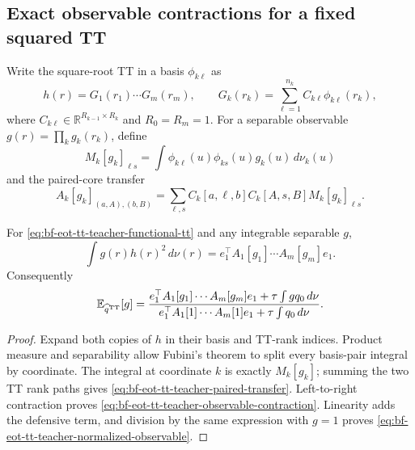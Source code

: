 \subsection{Exact observable contractions for a fixed squared TT}

Write the square-root TT in a basis \(\phi_{k\ell}\) as
\begin{equation}
 h(r)=G_1(r_1)\cdots G_m(r_m),\qquad
 G_k(r_k)=\sum_{\ell=1}^{n_k}C_{k\ell}\phi_{k\ell}(r_k),
 \label{eq:bf-eot-tt-teacher-functional-tt}
\end{equation}
where \(C_{k\ell}\in\mathbb R^{R_{k-1}\times R_k}\) and
\(R_0=R_m=1\).  For a separable observable
\(g(r)=\prod_kg_k(r_k)\), define
\begin{equation}
 M_k[g_k]_{\ell s}
 =\int\phi_{k\ell}(u)\phi_{ks}(u)g_k(u)\,d\nu_k(u)
 \label{eq:bf-eot-tt-teacher-operator-matrix}
\end{equation}
and the paired-core transfer
\begin{equation}
 A_k[g_k]_{(a,A),(b,B)}
 =\sum_{\ell,s}C_k[a,\ell,b]C_k[A,s,B]M_k[g_k]_{\ell s}.
 \label{eq:bf-eot-tt-teacher-paired-transfer}
\end{equation}

\begin{proposition}
\label{prop:bf-eot-tt-teacher-observable-contraction}
For \eqref{eq:bf-eot-tt-teacher-functional-tt} and any integrable separable
\(g\),
\begin{equation}
 \int g(r)h(r)^2\,d\nu(r)
 =e_1^\top A_1[g_1]\cdots A_m[g_m]e_1.
 \label{eq:bf-eot-tt-teacher-observable-contraction}
\end{equation}
Consequently
\begin{equation}
 \mathbb E_{\widehat q^{\rm TT}}[g]
 =\frac{e_1^\top A_1[g_1]\cdots A_m[g_m]e_1
       +\tau\int gq_0\,d\nu}
      {e_1^\top A_1[1]\cdots A_m[1]e_1
       +\tau\int q_0\,d\nu}.
 \label{eq:bf-eot-tt-teacher-normalized-observable}
\end{equation}
\end{proposition}

\begin{proof}
Expand both copies of \(h\) in their basis and TT-rank indices.  Product
measure and separability allow Fubini's theorem to split every basis-pair
integral by coordinate.  The integral at coordinate \(k\) is exactly
\(M_k[g_k]\); summing the two TT rank paths gives
\eqref{eq:bf-eot-tt-teacher-paired-transfer}.  Left-to-right contraction proves
\eqref{eq:bf-eot-tt-teacher-observable-contraction}.  Linearity adds the
defensive term, and division by the same expression with \(g=1\) proves
\eqref{eq:bf-eot-tt-teacher-normalized-observable}.
\end{proof}

